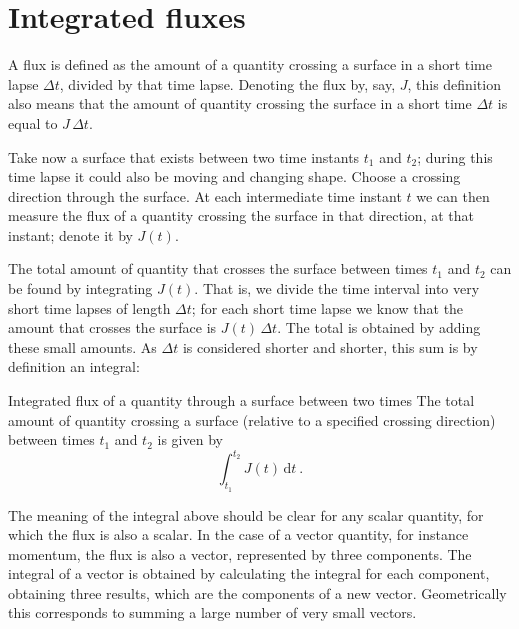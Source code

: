 \documentclass[a4paper,12pt,%
onecolumn,oneside,titlepage,%
british%
]{memoir}
\newcommand*{\di}{\mathrm{d}}%
\newcommand*{\incr}{\Delta}%
\renewcommand*{\|}[1][]{\nonscript\:#1\vert\nonscript\:\mathopen{}}
\newcommand*{\yJ}{J}
\newcommand*{\Dt}{\incr t}
\begin{document}
% 
%


\section{Integrated fluxes}
\label{sec:total_flow}

A flux is defined as the amount of a quantity crossing a surface in a short time lapse $\Dt$, divided by that time lapse. Denoting the flux by, say, $\yJ$, this definition also means that the amount of quantity crossing the surface in a short time $\Dt$ is equal to $\yJ\,\Dt$.

Take now a surface that exists between two time instants $t_{1}$ and $t_{2}$; during this time lapse it could also be moving and changing shape. Choose a crossing direction through the surface. At each intermediate time instant $t$ we can then measure the flux of a quantity crossing the surface in that direction, at that instant; denote it by $\yJ(t)$.

The total amount of quantity that crosses the surface between times $t_{1}$ and $t_{2}$ can be found by integrating $\yJ(t)$. That is, we divide the time interval into very short time lapses of length $\Dt$; for each short time lapse we know that the amount that crosses the surface is $\yJ(t)\,\Dt$. The total is obtained by adding these small amounts. As $\Dt$ is considered shorter and shorter, this sum is by definition an integral:
\begin{definition}{Integrated flux of a quantity through a surface between two times}
The total amount of quantity crossing a surface (relative to a specified crossing direction) between times $t_{1}$ and $t_{2}$ is given by
  \begin{equation}
    \label{eq:total_flow_integral}
     \int_{t_{1}}^{t_{2}}\!\! \yJ(t)\,\di t\ .
  \end{equation}
\end{definition}

The meaning of the integral above should be clear for any scalar quantity, for which the flux is also a scalar. In the case of a vector quantity, for instance momentum, the flux is also a vector, represented by three components. The integral of a vector is obtained by calculating the integral for each component, obtaining three results, which are the components of a new vector. Geometrically this corresponds to summing a large number of very small vectors.
\end{document}
